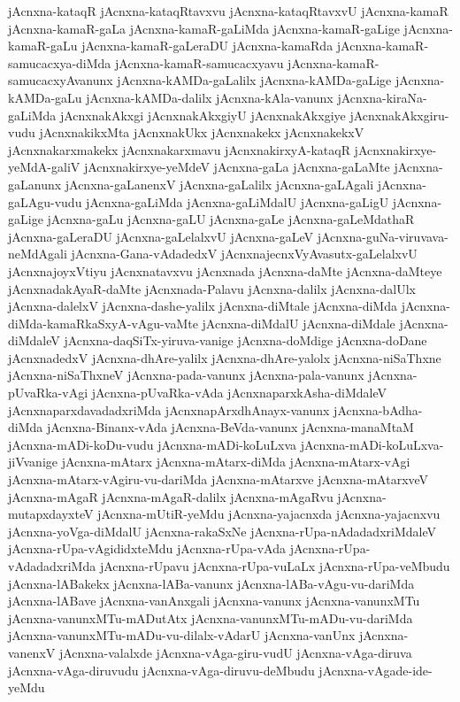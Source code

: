 {jAcnxna-kataqR
jAcnxna-kataqRtavxvu
jAcnxna-kataqRtavxvU
jAcnxna-kamaR
jAcnxna-kamaR-gaLa
jAcnxna-kamaR-gaLiMda
jAcnxna-kamaR-gaLige
jAcnxna-kamaR-gaLu
jAcnxna-kamaR-gaLeraDU
jAcnxna-kamaRda
jAcnxna-kamaR-samucacxya-diMda
jAcnxna-kamaR-samucacxyavu
jAcnxna-kamaR-samucacxyAvanunx
jAcnxna-kAMDa-gaLalilx
jAcnxna-kAMDa-gaLige
jAcnxna-kAMDa-gaLu
jAcnxna-kAMDa-dalilx
jAcnxna-kAla-vanunx
jAcnxna-kiraNa-gaLiMda
jAcnxnakAkxgi
jAcnxnakAkxgiyU
jAcnxnakAkxgiye
jAcnxnakAkxgiru-vudu
jAcnxnakikxMta
jAcnxnakUkx
jAcnxnakekx
jAcnxnakekxV
jAcnxnakarxmakekx
jAcnxnakarxmavu
jAcnxnakirxyA-kataqR
jAcnxnakirxye-yeMdA-galiV
jAcnxnakirxye-yeMdeV
jAcnxna-gaLa
jAcnxna-gaLaMte
jAcnxna-gaLanunx
jAcnxna-gaLanenxV
jAcnxna-gaLalilx
jAcnxna-gaLAgali
jAcnxna-gaLAgu-vudu
jAcnxna-gaLiMda
jAcnxna-gaLiMdalU
jAcnxna-gaLigU
jAcnxna-gaLige
jAcnxna-gaLu
jAcnxna-gaLU
jAcnxna-gaLe
jAcnxna-gaLeMdathaR
jAcnxna-gaLeraDU
jAcnxna-gaLelalxvU
jAcnxna-gaLeV
jAcnxna-guNa-viruvava-neMdAgali
jAcnxna-Gana-vAdadedxV
jAcnxnajecnxVyAvasutx-gaLelalxvU
jAcnxnajoyxVtiyu
jAcnxnatavxvu
jAcnxnada
jAcnxna-daMte
jAcnxna-daMteye
jAcnxnadakAyaR-daMte
jAcnxnada-Palavu
jAcnxna-dalilx
jAcnxna-dalUlx
jAcnxna-dalelxV
jAcnxna-dashe-yalilx
jAcnxna-diMtale
jAcnxna-diMda
jAcnxna-diMda-kamaRkaSxyA-vAgu-vaMte
jAcnxna-diMdalU
jAcnxna-diMdale
jAcnxna-diMdaleV
jAcnxna-daqSiTx-yiruva-vanige
jAcnxna-doMdige
jAcnxna-doDane
jAcnxnadedxV
jAcnxna-dhAre-yalilx
jAcnxna-dhAre-yalolx
jAcnxna-niSaThxne
jAcnxna-niSaThxneV
jAcnxna-pada-vanunx
jAcnxna-pala-vanunx
jAcnxna-pUvaRka-vAgi
jAcnxna-pUvaRka-vAda
jAcnxnaparxkAsha-diMdaleV
jAcnxnaparxdavadadxriMda
jAcnxnapArxdhAnayx-vanunx
jAcnxna-bAdha-diMda
jAcnxna-Binanx-vAda
jAcnxna-BeVda-vanunx
jAcnxna-manaMtaM
jAcnxna-mADi-koDu-vudu
jAcnxna-mADi-koLuLxva
jAcnxna-mADi-koLuLxva-jiVvanige
jAcnxna-mAtarx
jAcnxna-mAtarx-diMda
jAcnxna-mAtarx-vAgi
jAcnxna-mAtarx-vAgiru-vu-dariMda
jAcnxna-mAtarxve
jAcnxna-mAtarxveV
jAcnxna-mAgaR
jAcnxna-mAgaR-dalilx
jAcnxna-mAgaRvu
jAcnxna-mutapxdayxteV
jAcnxna-mUtiR-yeMdu
jAcnxna-yajacnxda
jAcnxna-yajacnxvu
jAcnxna-yoVga-diMdalU
jAcnxna-rakaSxNe
jAcnxna-rUpa-nAdadadxriMdaleV
jAcnxna-rUpa-vAgididxteMdu
jAcnxna-rUpa-vAda
jAcnxna-rUpa-vAdadadxriMda
jAcnxna-rUpavu
jAcnxna-rUpa-vuLaLx
jAcnxna-rUpa-veMbudu
jAcnxna-lABakekx
jAcnxna-lABa-vanunx
jAcnxna-lABa-vAgu-vu-dariMda
jAcnxna-lABave
jAcnxna-vanAnxgali
jAcnxna-vanunx
jAcnxna-vanunxMTu
jAcnxna-vanunxMTu-mADutAtx
jAcnxna-vanunxMTu-mADu-vu-dariMda
jAcnxna-vanunxMTu-mADu-vu-dilalx-vAdarU
jAcnxna-vanUnx
jAcnxna-vanenxV
jAcnxna-valalxde
jAcnxna-vAga-giru-vudU
jAcnxna-vAga-diruva
jAcnxna-vAga-diruvudu
jAcnxna-vAga-diruvu-deMbudu
jAcnxna-vAgade-ide-yeMdu
}
